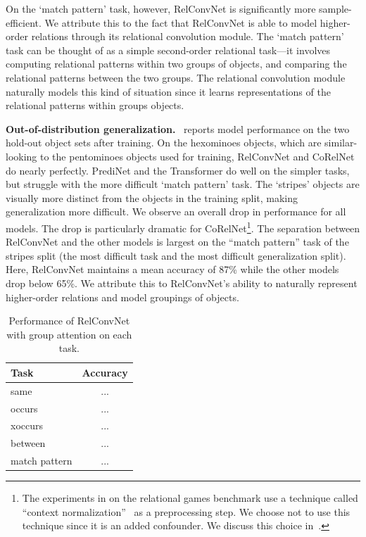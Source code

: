 On the `match pattern' task, however, RelConvNet is significantly more sample-efficient. We attribute this to the fact that RelConvNet is able to model higher-order relations through its relational convolution module. The `match pattern' task can be thought of as a simple second-order relational task---it involves computing relational patterns within two groups of objects, and comparing the relational patterns between the two groups. The relational convolution module naturally models this kind of situation since it learns representations of the relational patterns within groups objects. %

\textbf{Out-of-distribution generalization.}~ reports model performance on the two hold-out object sets after training. On the hexominoes objects, which are similar-looking to the pentominoes objects used for training, RelConvNet and CoRelNet do nearly perfectly. PrediNet and the Transformer do well on the simpler tasks, but struggle with the more difficult `match pattern' task. The `stripes' objects are visually more distinct from the objects in the training split, making generalization more difficult. We observe an overall drop in performance for all models. The drop is particularly dramatic for CoRelNet\footnote{The experiments in \citep{kergNeuralArchitecture2022} on the relational games benchmark use a technique called ``context normalization''~\citep{webbLearningRepresentationsThat2020} as a preprocessing step. We choose not to use this technique since it is an added confounder. We discuss this choice in~.}.
The separation between RelConvNet and the other models is largest on the ``match pattern'' task of the stripes split (the most difficult task and the most difficult generalization split). Here, RelConvNet maintains a mean accuracy of 87\% while the other models drop below 65\%. We attribute this to RelConvNet's ability to naturally represent higher-order relations and model groupings of objects.

\begin{table}
    \centering
    \caption{Performance of RelConvNet with group attention on each task.}\label{tab:relgames_groupattn_resuls}
    \begin{tabular}{lc}
        \toprule
        Task & Accuracy \\
        \midrule
        same & ...\\
        occurs & ... \\
        xoccurs & ...\\
        between & ... \\
        match pattern & ...\\
        \bottomrule
    \end{tabular}
    \vskip-10pt
\end{table}

